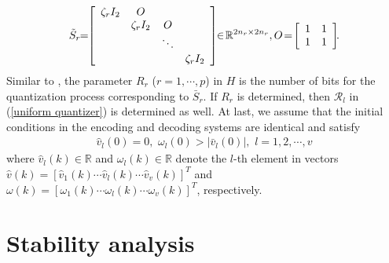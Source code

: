 \documentclass{autart}
\begin{document}
\begin{align}
\tilde S_r \!\! = \! \!
\left[\begin{array}{cccc}\setlength{\arraycolsep}{2pt} 
\zeta_r I_2 &O & & \\ & \zeta_r I_2 & O & \\ & & \ddots \\ & & &\zeta_r I_2
\end{array}\right] \!\!  \in  \!  \mathbb{R}^{2n_r \times 2n_r},
O \!=\!
\left[\begin{array}{cc} \setlength{\arraycolsep}{3pt}
1& 1 \\
1&1
\end{array}\right]\!\!.
\end{align}
Similar to \cite{feng2020tac}, the parameter $R_r$ ($r=1, \cdots, p$) in $H$ is the number of bits for the quantization process corresponding to $\bar S_r$. If $R_r$ is determined, then $\mathcal R_l$ in (\ref{uniform quantizer}) is determined as well.   
At last, we assume that the initial conditions in the encoding and decoding systems are identical and satisfy
\begin{align} \label{Jordan initial condition}
\hat v_l (0  ) = 0,\,\,  \omega_l(0 ) >  |\bar{v} _l(0 )|,\,\,  l= {1, 2, \cdots, v}
\end{align} 
where $\hat v_l(k) \in \mathbb R$ and $\omega_l(k) \in \mathbb R$ denote the $l$-th element in vectors $\hat v(k)= [\hat v_1(k)\cdots \hat v_l(k) \cdots \hat v_v(k)]^T$ and $\omega(k)= [\omega_1(k)\cdots \omega_l(k) \cdots   \omega_v(k)]^T$, respectively. 

				\vspace{-1mm}
\section{Stability analysis}
				\vspace{-1mm}
\end{document}
